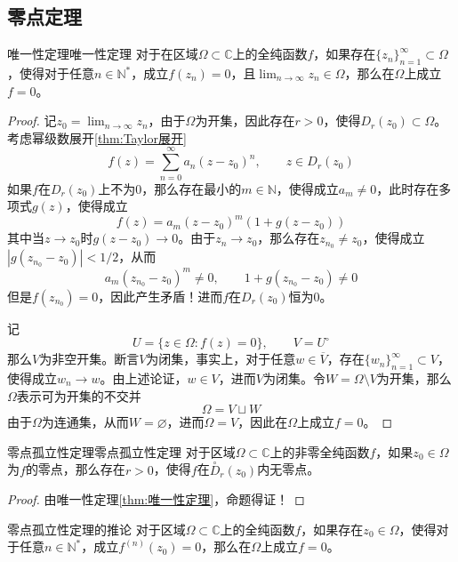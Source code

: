 \documentclass[lang = cn, scheme = chinese, thmcnt = section]{elegantbook}
\newcommand{\N}{\mathbb{N}}            %
\newcommand{\C}{\mathbb{C}}  		   %
\newcommand{\sub}{\subset}             %
\begin{document}
\subsection{零点定理}

\begin{theorem}{唯一性定理}{唯一性定理}
	对于在区域$\Omega\sub\C$上的全纯函数$f$，如果存在$\{z_n\}_{n=1}^{\infty}\sub\Omega$，使得对于任意$n\in\N^*$，成立$f(z_n)=0$，且$\displaystyle\lim_{n\to\infty}{z_n}\in\Omega$，那么在$\Omega$上成立$f=0$。
\end{theorem}

\begin{proof}
	记$\displaystyle z_0=\lim_{n\to\infty}{z_n}$，由于$\Omega$为开集，因此存在$r>0$，使得$D_r(z_0)\sub\Omega$。考虑幂级数展开\ref{thm:Taylor展开}%
	$$
	f(z)=\sum_{n=0}^{\infty}a_n(z-z_0)^n,\qquad 
	z\in D_r(z_0)
	$$
	如果$f$在$D_r(z_0)$上不为$0$，那么存在最小的$m\in\N$，使得成立$a_m\ne 0$，此时存在多项式$g(z)$，使得成立
	$$
	f(z)=a_m(z-z_0)^m(1+g(z-z_0))
	$$
	其中当$z\to z_0$时$g(z-z_0)\to 0$。由于$z_n\to z_0$，那么存在$z_{n_0}\ne z_0$，使得成立$|g(z_{n_0}-z_0)|<1/2$，从而%
	$$
	a_m(z_{n_0}-z_0)^m\ne 0,\qquad
	1+g(z_{n_0}-z_0)\ne 0
	$$
	但是$f(z_{n_0})=0$，因此产生矛盾！进而$f$在$D_r(z_0)$恒为$0$。
	
	记%
	$$
	U=\{ z\in\Omega:f(z)=0 \},\qquad V=U^\circ
	$$
	那么$V$为非空开集。断言$V$为闭集，事实上，对于任意$w\in \overline{V}$，存在$\{ w_n \}_{n=1}^{\infty}\sub V$，使得成立$w_n\to w$。由上述论证，$w\in V$，进而$V$为闭集。令$W=\Omega\setminus V$为开集，那么$\Omega$表示可为开集的不交并%
	$$
	\Omega=V\sqcup W
	$$
	由于$\Omega$为连通集，从而$W=\varnothing$，进而$\Omega=V$，因此在$\Omega$上成立$f=0$。
\end{proof}

\begin{corollary}{零点孤立性定理}{零点孤立性定理}
	对于区域$\Omega\sub\C$上的非零全纯函数$f$，如果$z_0\in\Omega$为$f$的零点，那么存在$r>0$，使得$f$在$\overset{\circ}{D}_r(z_0)$内无零点。
\end{corollary}

\begin{proof}
	由唯一性定理\ref{thm:唯一性定理}，命题得证！
\end{proof}

\begin{corollary}{}{零点孤立性定理的推论}
	对于区域$\Omega\sub\C$上的全纯函数$f$，如果存在$z_0\in \Omega$，使得对于任意$n\in\N^*$，成立$f^{(n)}(z_0)=0$，那么在$\Omega$上成立$f=0$。
\end{corollary}
\end{document}
